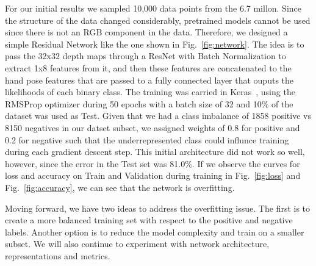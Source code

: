 \documentclass[letterpaper, 10 pt]{article}
\newcommand{\figref}[1]{Fig.~\ref{#1}} %
\begin{document}
For our initial results we sampled 10,000 data points from the 6.7 millon. 
Since the structure of the data changed considerably, pretrained models cannot be used since there is not an RGB component in the data. 
Therefore, we designed a simple Residual Network like the one shown in \figref{fig:network}. 
The idea is to pass the 32x32 depth maps through a ResNet with Batch Normalization to extract 1x8 features from it, and then these features are concatenated to the hand pose features that are passed to a fully connected layer that ouputs the likelihoods of each binary class. 
The training was carried in Keras~\cite{chollet2017keras}, using the RMSProp optimizer during 50 epochs with a batch size of 32 and 10\% of the dataset was used as Test. 
Given that we had a class imbalance of 1858 positive vs 8150 negatives in our datset subset, we assigned weights of 0.8 for positive and 0.2 for negative such that the underrepresented class could influnce training during each gradient descent step. 
This initial architecture did not work so well, however, since the error in the Test set was 81.0\%. 
If we observe the curves for loss and accuracy on Train and Validation during training in \figref{fig:loss} and \figref{fig:accuracy}, we can see that the network is overfitting. 

Moving forward, we have two ideas to address the overfitting issue.
The first is to create a more balanced training set with respect to the positive and negative labels. 
Another option is to reduce the model complexity and train on a smaller subset. 
We will also continue to experiment with network architecture, representations and metrics. 
\end{document}
